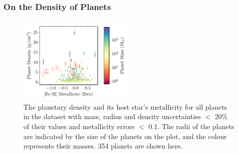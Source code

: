\documentclass[a4paper,twocolumn,12pt]{article}
\begin{document}









\subsubsection{On the Density of Planets}

\begin{figure}[h!]
    \centering
    \includegraphics[width=0.5\textwidth]{Graphs/FeH vs Density Planet Plot.pdf}
    \caption{The planetary density and its host star's metallicity for all planets in the dataset with mass, radius and density uncertainties $<$ 20\% of their values and metallicity errors $<$ 0.1. The radii of the planets are indicated by the size of the planets on the plot, and the colour represents their masses. 354 planets are shown here.}
    \label{figure: Fe/H vs density parameter plot}
\end{figure}
\end{document}
